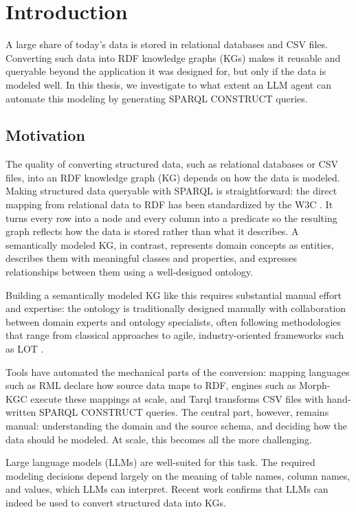 \section{Introduction}\label{sec:introduction}
A large share of today's data is stored in relational databases and CSV files. Converting such data into RDF knowledge graphs (KGs) makes it reusable and queryable beyond the application it was designed for, but only if the data is modeled well. In this thesis, we investigate to what extent an LLM agent can automate this modeling by generating SPARQL CONSTRUCT queries.

\subsection{Motivation}\label{sec:motivation}
The quality of converting structured data, such as relational databases or CSV files, into an RDF knowledge graph (KG) depends on how the data is modeled. Making structured data queryable with SPARQL is straightforward: the direct mapping from relational data to RDF has been standardized by the W3C \citep{w3c2012directmapping}. It turns every row into a node and every column into a predicate so the resulting graph reflects how the data is stored rather than what it describes. A semantically modeled KG, in contrast, represents domain concepts as entities, describes them with meaningful classes and properties, and expresses relationships between them using a well-designed ontology.

Building a semantically modeled KG like this requires substantial manual effort and expertise: the ontology is traditionally designed manually with collaboration between domain experts and ontology specialists, often following methodologies that range from classical approaches \citep{fernandez1997methontology} to agile, industry-oriented frameworks such as LOT \citep{povedavillalon2022lot}. 

Tools have automated the mechanical parts of the conversion: mapping languages such as RML \citep{dimou2014rml} declare how source data maps to RDF, engines such as Morph-KGC \citep{arenas2024morphkgc} execute these mappings at scale, and Tarql \citep{tarql} transforms CSV files with hand-written SPARQL CONSTRUCT queries. The central part, however, remains manual: understanding the domain and the source schema, and deciding how the data should be modeled. At scale, this becomes all the more challenging.

Large language models (LLMs) are well-suited for this task. The required modeling decisions depend largely on the meaning of table names, column names, and values, which LLMs can interpret. Recent work confirms that LLMs can indeed be used to convert structured data into KGs. 

